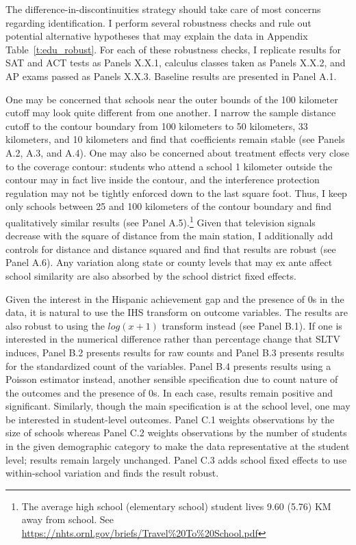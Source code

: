 \documentclass[11pt]{article}
\begin{document}
The difference-in-discontinuities strategy should take care of most concerns regarding identification. I perform several robustness checks and rule out potential alternative hypotheses that may explain the data in Appendix Table~\ref{t:edu_robust}. For each of these robustness checks, I replicate results for SAT and ACT tests as Panels X.X.1, calculus classes taken as Panels X.X.2, and AP exams passed as Panels X.X.3. Baseline results are presented in Panel A.1.

One may be concerned that schools near the outer bounds of the 100 kilometer cutoff may look quite different from one another. I narrow the sample distance cutoff to the contour boundary from 100 kilometers to 50 kilometers, 33 kilometers, and 10 kilometers and find that coefficients remain stable (see Panels A.2, A.3, and A.4). One may also be concerned about treatment effects very close to the coverage contour: students who attend a school 1 kilometer outside the contour may in fact live inside the contour, and the interference protection regulation may not be tightly enforced down to the last square foot. Thus, I keep only schools between 25 and 100 kilometers of the contour boundary and find qualitatively similar results (see Panel A.5).\footnote{ The average high school (elementary school) student lives 9.60 (5.76) KM away from school. See \url{https://nhts.ornl.gov/briefs/Travel\%20To\%20School.pdf} } Given that television signals decrease with the square of distance from the main station, I additionally add controls for distance and distance squared and find that results are robust (see Panel A.6). Any variation along state or county levels that may ex ante affect school similarity are also absorbed by the school district fixed effects. 

Given the interest in the Hispanic achievement gap and the presence of 0s in the data, it is natural to use the IHS transform on outcome variables. The results are also robust to using the $log(x+1)$ transform instead (see Panel B.1). If one is interested in the numerical difference rather than percentage change that SLTV induces, Panel B.2 presents results for raw counts and Panel B.3 presents results for the standardized count of the variables. Panel B.4 presents results using a Poisson estimator instead, another sensible specification due to count nature of the outcomes and the presence of 0s. In each case, results remain positive and significant. Similarly, though the main specification is at the school level, one may be interested in student-level outcomes. Panel C.1 weights observations by the size of schools whereas Panel C.2 weights observations by the number of students in the given demographic category to make the data representative at the student level; results remain largely unchanged. Panel C.3 adds school fixed effects to use within-school variation and finds the result robust.
\end{document}

